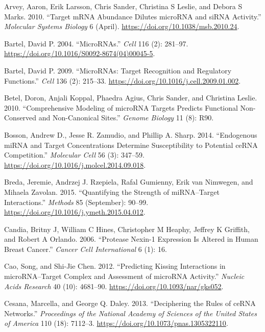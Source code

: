 \documentclass[]{article}
\begin{document}
\leavevmode\hypertarget{ref-arvey_target_2010}{}%
Arvey, Aaron, Erik Larsson, Chris Sander, Christina S Leslie, and Debora
S Marks. 2010. ``Target mRNA Abundance Dilutes microRNA and siRNA
Activity.'' \emph{Molecular Systems Biology} 6 (April).
\url{https://doi.org/10.1038/msb.2010.24}.

\leavevmode\hypertarget{ref-bartel_micrornas_2004}{}%
Bartel, David P. 2004. ``MicroRNAs.'' \emph{Cell} 116 (2): 281--97.
\url{https://doi.org/10.1016/S0092-8674(04)00045-5}.

\leavevmode\hypertarget{ref-bartel_micrornas:_2009}{}%
Bartel, David P. 2009. ``MicroRNAs: Target Recognition and Regulatory
Functions.'' \emph{Cell} 136 (2): 215--33.
\url{https://doi.org/10.1016/j.cell.2009.01.002}.

\leavevmode\hypertarget{ref-betel2010comprehensive}{}%
Betel, Doron, Anjali Koppal, Phaedra Agius, Chris Sander, and Christina
Leslie. 2010. ``Comprehensive Modeling of microRNA Targets Predicts
Functional Non-Conserved and Non-Canonical Sites.'' \emph{Genome
Biology} 11 (8): R90.

\leavevmode\hypertarget{ref-bosson_endogenous_2014}{}%
Bosson, Andrew D., Jesse R. Zamudio, and Phillip A. Sharp. 2014.
``Endogenous miRNA and Target Concentrations Determine Susceptibility to
Potential ceRNA Competition.'' \emph{Molecular Cell} 56 (3): 347--59.
\url{https://doi.org/10.1016/j.molcel.2014.09.018}.

\leavevmode\hypertarget{ref-breda_quantifying_2015}{}%
Breda, Jeremie, Andrzej J. Rzepiela, Rafal Gumienny, Erik van Nimwegen,
and Mihaela Zavolan. 2015. ``Quantifying the Strength of miRNA--Target
Interactions.'' \emph{Methods} 85 (September): 90--99.
\url{https://doi.org/10.1016/j.ymeth.2015.04.012}.

\leavevmode\hypertarget{ref-candia2006protease}{}%
Candia, Britny J, William C Hines, Christopher M Heaphy, Jeffrey K
Griffith, and Robert A Orlando. 2006. ``Protease Nexin-1 Expression Is
Altered in Human Breast Cancer.'' \emph{Cancer Cell International} 6
(1): 16.

\leavevmode\hypertarget{ref-cao_predicting_2012}{}%
Cao, Song, and Shi-Jie Chen. 2012. ``Predicting Kissing Interactions in
microRNA--Target Complex and Assessment of microRNA Activity.''
\emph{Nucleic Acids Research} 40 (10): 4681--90.
\url{https://doi.org/10.1093/nar/gks052}.

\leavevmode\hypertarget{ref-cesana_deciphering_2013}{}%
Cesana, Marcella, and George Q. Daley. 2013. ``Deciphering the Rules of
ceRNA Networks.'' \emph{Proceedings of the National Academy of Sciences
of the United States of America} 110 (18): 7112--3.
\url{https://doi.org/10.1073/pnas.1305322110}.
\end{document}
